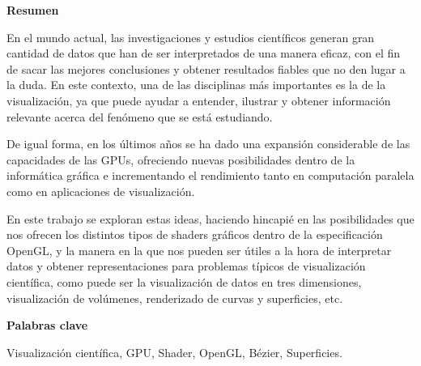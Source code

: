 
\newpage

\thispagestyle{empty}

\begin{center}

{\bf \Huge Resumen}

  \end{center} \vspace{1cm}

	En el mundo actual, las investigaciones y estudios científicos generan gran
	cantidad de datos que han de ser interpretados de una manera eficaz, con el
	fin de sacar las mejores conclusiones y obtener resultados fiables que no
	den lugar a la duda.  En este contexto, una de las disciplinas más
	importantes es la de la visualización, ya que puede ayudar a entender,
	ilustrar y obtener información relevante acerca del fenómeno que se está
	estudiando.

	De igual forma, en los últimos años se ha dado una expansión considerable de
	las capacidades de las GPUs, ofreciendo nuevas posibilidades dentro de
	la informática gráfica e incrementando el rendimiento tanto en computación
	paralela como en aplicaciones de visualización.
	
	En este trabajo se exploran estas ideas, haciendo hincapié en las
	posibilidades que nos ofrecen los distintos tipos de shaders gráficos dentro
	de la especificación OpenGL, y la manera en la que nos pueden ser útiles a
	la hora de interpretar datos y obtener representaciones para problemas
	típicos de visualización científica, como puede ser la visualización de
	datos en tres dimensiones, visualización de volúmenes, renderizado de curvas
	y superficies, etc.
	
\vspace{1cm}


\begin{center}

{\bf \Large Palabras clave}

   \end{center}

   \vspace{0.5cm}
   
   Visualización científica, GPU, Shader, OpenGL, Bézier, Superficies.
